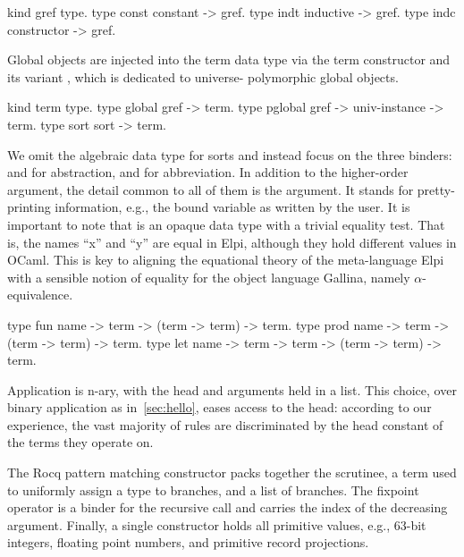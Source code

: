 \documentclass[a4paper, 11pt]{book}
\begin{document}
\begin{elpicode}
kind gref type.
type const constant -> gref.            %
type indt  inductive -> gref.           %
type indc  constructor -> gref.         %
\end{elpicode}

Global objects are injected into the term data type via the  term
constructor and its variant , which is dedicated to universe-
polymorphic global objects.

\begin{elpicode}
kind term type.
type global  gref -> term.
type pglobal gref -> univ-instance -> term.
type sort    sort -> term.                 %
\end{elpicode}

We omit the algebraic data type for sorts and instead focus on the three
binders:  and  for abstraction, and  for
abbreviation. In addition to the higher-order argument, the detail common to
all of them is the  argument. It stands for pretty-printing
information, e.g., the bound variable as written by the user. It is important
to note that  is an opaque data type with a trivial equality test.
That is, the names ``x'' and ``y'' are equal in Elpi, although they hold
different values in OCaml. This is key to aligning the equational theory of
the meta-language Elpi with a sensible notion of equality for the object
language Gallina, namely $\alpha$-equivalence.

\begin{elpicode}
type fun  name -> term -> (term -> term) -> term.            %
type prod name -> term -> (term -> term) -> term.            %
type let  name -> term -> term -> (term -> term) -> term.    %
\end{elpicode}


Application is n-ary, with the head and arguments held in a list. This choice,
over binary application as in~\cref{sec:hello}, eases access to the head:
according to our experience, the vast majority of rules are discriminated by
the head constant of the terms they operate on.

The Rocq pattern matching constructor packs together the scrutinee, a term
used to uniformly assign a type to branches, and a list of branches. The
fixpoint operator is a binder for the recursive call and carries the index of
the decreasing argument. Finally, a single constructor holds all primitive
values, e.g., 63-bit integers, floating point numbers, and primitive record
projections.
\end{document}
